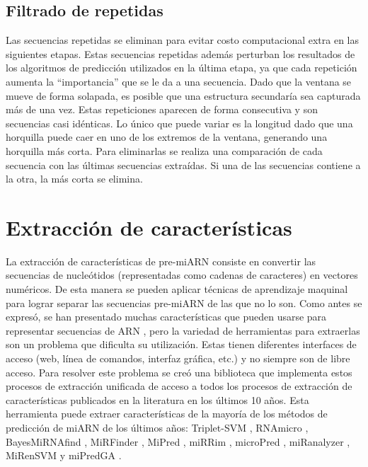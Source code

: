 \subsection{Filtrado de repetidas}

Las secuencias repetidas se eliminan para evitar costo computacional extra en las siguientes etapas. Estas secuencias repetidas además perturban los
resultados de los algoritmos de predicción utilizados en la última etapa, ya que cada repetición aumenta la “importancia” que se le da a una secuencia.
 Dado que la ventana se mueve de forma solapada, es posible que una estructura secundaría sea capturada más de una vez. Estas repeticiones aparecen de forma
 consecutiva y son secuencias casi idénticas. Lo único que puede variar es la longitud dado que una horquilla puede caer en uno de los extremos de la ventana,
 generando una horquilla más corta. Para eliminarlas se realiza una comparación de cada secuencia con las últimas secuencias extraídas. Si una de las secuencias
 contiene a la otra, la más corta se elimina.

\section{Extracción de características}

La extracción de características de pre-miARN consiste en convertir las secuencias de nucleótidos (representadas como cadenas de caracteres) en vectores
numéricos. De esta manera se pueden aplicar técnicas de aprendizaje maquinal para lograr separar las secuencias pre-miARN de las que no lo son. Como antes se
expresó, se han presentado muchas características que pueden usarse para representar secuencias de ARN \citep{Lopes2014}, pero la variedad de herramientas para
extraerlas son un problema que dificulta su utilización. Estas tienen diferentes interfaces de acceso (web, línea de comandos, interfaz gráfica, etc.) y no
siempre son de libre acceso. Para resolver este problema se creó una biblioteca que implementa estos procesos de extracción unificada de acceso a todos los
procesos de extracción de características publicados en la literatura en los últimos 10 años. Esta herramienta puede extraer características de la mayoría de
los métodos de predicción de miARN de los últimos años: Triplet-SVM \citep{xue2005classification}, RNAmicro \citep{hertel2006hairpins}, BayesMiRNAfind
\citep{yousef2006combining}, MiRFinder \citep{huang2007mirfinder}, MiPred \citep{jiang2007mipred}, miRRim \citep{terai2007mirrim}, microPred
\citep{batuwita2009micropred}, miRanalyzer \citep{hackenberg2009miranalyzer}, MiRenSVM \citep{ding2010mirensvm} y miPredGA \citep{xuan2011genetic}.

